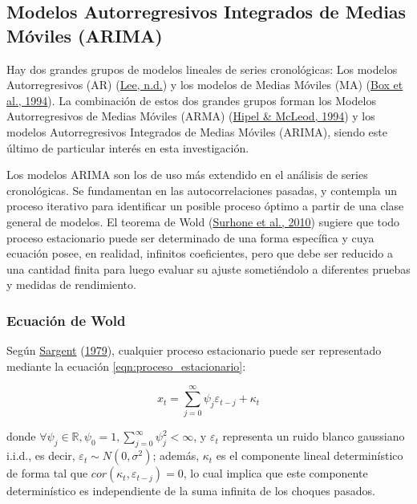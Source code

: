 \documentclass[
]{article}
\begin{document}
\subsection{Modelos Autorregresivos Integrados de Medias Móviles (ARIMA)}

Hay dos grandes grupos de modelos lineales de series cronológicas: Los
modelos Autorregresivos (AR) (\protect\hyperlink{ref-Lee}{Lee, n.d.}) y
los modelos de Medias Móviles (MA)
(\protect\hyperlink{ref-box-jenkins}{Box et al., 1994}). La combinación
de estos dos grandes grupos forman los Modelos Autorregresivos de Medias
Móviles (ARMA) (\protect\hyperlink{ref-Hipel}{Hipel \& McLeod, 1994}) y
los modelos Autorregresivos Integrados de Medias Móviles (ARIMA), siendo
este último de particular interés en esta investigación.

Los modelos ARIMA son los de uso más extendido en el análisis de series
cronológicas. Se fundamentan en las autocorrelaciones pasadas, y
contempla un proceso iterativo para identificar un posible proceso
óptimo a partir de una clase general de modelos. El teorema de Wold
(\protect\hyperlink{ref-Wold}{Surhone et al., 2010}) sugiere que todo
proceso estacionario puede ser determinado de una forma específica y
cuya ecuación posee, en realidad, infinitos coeficientes, pero que debe
ser reducido a una cantidad finita para luego evaluar su ajuste
sometiéndolo a diferentes pruebas y medidas de rendimiento.

\subsubsection{Ecuación de Wold}

Según \protect\hyperlink{ref-sargent_macro}{Sargent}
(\protect\hyperlink{ref-sargent_macro}{1979}), cualquier proceso
estacionario puede ser representado mediante la ecuación
\ref{eqn:proceso_estacionario}:

\begin{equation}
\label{eqn:proceso_estacionario}
x_t=\sum_{j=0}^{\infty} \psi_j\varepsilon_{t-j}+\kappa_t
\end{equation}

donde
\(\forall \psi_j \in \mathbb{R}, \psi_0=1, \sum_{j=0}^{\infty} \psi_j^2<\infty\),
y \(\varepsilon_t\) representa un ruido blanco gaussiano i.i.d., es
decir, \(\varepsilon_t \sim N(0, \sigma^2)\); además, \(\kappa_t\) es el
componente lineal determinístico de forma tal que
\(cor(\kappa_t,\varepsilon_{t-j})=0\), lo cual implica que este
componente determinístico es independiente de la suma infinita de los
choques pasados.
\end{document}
